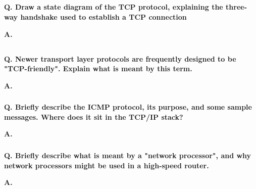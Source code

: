 \subsection{}

\textbf{Q. Draw a state diagram of the TCP protocol, explaining the three-way handshake
used to establish a TCP connection}

\textbf{A.}

\subsection{}

\subsubsection{}

\textbf{Q. Newer transport layer protocols are frequently designed to be "TCP-friendly".
Explain what is meant by this term.}

\textbf{A.}

\subsubsection{}

\textbf{Q. Briefly describe the ICMP protocol, its purpose, and some sample messages. Where
does it sit in the TCP/IP stack?}

\textbf{A.}

\subsubsection{}

\textbf{Q. Briefly describe what is meant by a "network processor", and why network
processors might be used in a high-speed router.}

\textbf{A.}

